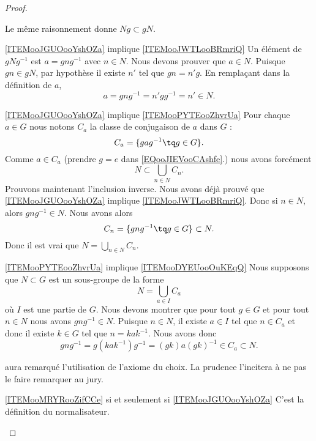 \begin{proof}
\begin{subproof}
		Le même raisonnement donne \( Ng\subset gN\).
		\item[\ref{ITEMooJGUOooYshOZa} implique \ref{ITEMooJWTLooBRmriQ}]
		Un élément de \( g Ng^{-1}\) est \( a=gng^{-1}\) avec \( n\in N\). Nous devons prouver que \( a\in N\). Puisque \( gn\in gN\), par hypothèse il existe \( n'\) tel que \( gn=n'g\). En remplaçant dans la définition de \( a\),
		\begin{equation}
			a=gng^{-1}=n'gg^{-1}=n'\in N.
		\end{equation}
		\item[\ref{ITEMooJGUOooYshOZa} implique \ref{ITEMooPYTEooZhvrUa}]
		Pour chaque \( a\in G\) nous notons \( C_a\) la classe de conjugaison de \( a\) dans \( G\) :
		\begin{equation}        \label{EQooJIEVooCAshfe}
			C_a=\{ gag^{-1}\tq g\in G \}.
		\end{equation}
		Comme \( a\in C_a\) (prendre \( g=e\) dans \eqref{EQooJIEVooCAshfe}.) nous avons forcément
		\begin{equation}
			N\subset\bigcup_{n\in N}C_n.
		\end{equation}
		Prouvons maintenant l'inclusion inverse. Nous avons déjà prouvé que \ref{ITEMooJGUOooYshOZa} implique \ref{ITEMooJWTLooBRmriQ}. Donc si \( n\in N\), alors \( gng^{-1}\in N\). Nous avons alors
		\begin{equation}
			C_n=\{ gng^{-1}\tq g\in G \}\subset N.
		\end{equation}
		Donc il est vrai que \( N=\bigcup_{n\in N}C_n\).
		\item[\ref{ITEMooPYTEooZhvrUa} implique \ref{ITEMooDYEUooOuKEqQ}]
		Nous supposons que \( N\subset G\) est un sous-groupe de la forme
		\begin{equation}
			N=\bigcup_{a\in I}C_a
		\end{equation}
		où \( I\) est une partie de \( G\). Nous devons montrer que pour tout \( g\in G\) et pour tout \( n\in N\) nous avons \( gng^{-1}\in N\). Puisque \( n\in N\), il existe \( a\in I\) tel que \( n\in C_a\) et donc il existe \( k\in G\) tel que \( n=kak^{-1}\). Nous avons donc
		\begin{equation}
			gng^{-1}=g(kak^{-1})g^{-1}=(gk)a(gk)^{-1}\in C_a\subset N.
		\end{equation}

		 aura remarqué l'utilisation de l'axiome du choix. La prudence l'incitera à ne pas le faire remarquer au jury.
		\item[\ref{ITEMooMRYRooZifCCe} si et seulement si \ref{ITEMooJGUOooYshOZa}]
		C'est la définition du normalisateur.
	\end{subproof}
\end{proof}

